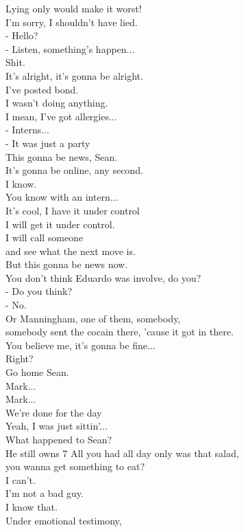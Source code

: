 \documentclass{article}
\begin{document}
\begin{multicols}{3}
Lying only would make it worst!\\
I'm sorry, I shouldn't have lied.\\
- Hello?\\
- Listen, something's happen...\\
Shit.\\
It's alright, it's gonna be alright.\\
I've posted bond.\\
I wasn't doing anything.\\
I mean, I've got allergies...\\
- Interns...\\
- It was just a party\\
This gonna be news, Sean.\\
It's gonna be online, any second.\\
I know.\\
You know with an intern...\\
It's cool, I have it under control\\
I will get it under control.\\
I will call someone\\
and see what the next move is.\\
But this gonna be news now.\\
You don't think Eduardo was involve, do you?\\
- Do you think?\\
- No.\\
Or Manningham, one of them, somebody,\\
somebody sent the cocain there, 'cause it got in there.\\
You believe me, it's gonna be fine...\\
Right?\\
Go home Sean.\\
Mark...\\
Mark...\\
We're done for the day\\
Yeah, I was just sittin'...\\
What happened to Sean?\\
He still owns 7%
All you had all day only was that salad,\\
you wanna get something to eat?\\
I can't.\\
I'm not a bad guy.\\
I know that.\\
Under emotional testimony,\\

\end{multicols}
\end{document}

